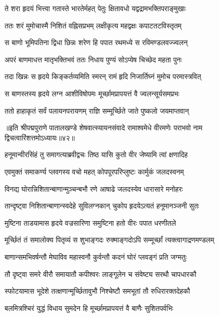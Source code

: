 \twolineshloka
{ते शरा हृदयं भित्त्वा गतास्ते भारतेर्महत्}
{पेतुः क्षितावधो यद्वद्रामभक्तिपराङ्मुखाः}%

\twolineshloka
{ततः शरं मुमोचास्मै निशितं वह्निसप्रभम्}
{लक्षीकृत्य महद्वक्षः कपाटतटविस्तृतम्}%

\twolineshloka
{स बाणो भूमिपतिना द्विधा छिन्नः शरेण हि}
{पपात रथमध्ये स रविमण्डलवज्ज्वलन्}%

\twolineshloka
{अपरं बाणमाधत्त मातृभक्तिभवं ततः}
{निधाय पुण्यं सोऽप्येष चिच्छेद महता पुनः}%

\twolineshloka
{तदा खिन्नः स हृदये किङ्कर्तव्यमिति स्मरन्}
{रामं हृदि निजार्तिघ्नं मुमोच परमास्त्रवित्}%

\twolineshloka
{स बाणस्तस्य हृदये लग्न आशीविषोपमः}
{मूर्च्छामप्रापयत्तं वै ज्वलन्सूर्यसमप्रभः}%

\twolineshloka
{ततो हाहाकृतं सर्वं पलायनपरायणम्}
{राज्ञि सम्मूर्च्छिते जाते पुष्कलो जयमाप्तवान्}%

॥इति श्रीपद्मपुराणे पातालखण्डे शेषवात्स्यायनसंवादे रामाश्वमेधे वीरमणेः पराभवो नाम द्विचत्वारिंशत्तमोऽध्यायः॥४२॥



\twolineshloka
{हनूमान्वीरसिंहं तु समागत्याब्रवीद्वचः}
{तिष्ठ यासि कुतो वीर जेष्यामि त्वां क्षणादिह}%

\twolineshloka
{एवमुक्तं समाकर्ण्य प्लवगस्य वचो महत्}
{कोपपूरपरिप्लुष्टः कार्मुकं जलदस्वनम्}%

\twolineshloka
{विनद्य घोरान्निशितान्बाणान्मुञ्चन्बभौ रणे}
{आषाढे जलदस्येव धारासारे मनोहरः}%

\twolineshloka
{तान्दृष्ट्वा निशितान्बाणान्स्वदेहे सुविलग्नकान्}
{चुकोप हृदयेऽत्यतं हनूमानञ्जनी सुतः}%

\twolineshloka
{मुष्टिना ताडयामास हृदये वज्रसारिणा}
{समुष्टिना हतो वीरः पपात धरणीतले}%

\twolineshloka
{मूर्च्छितं तं समालोक्य पितृव्यं स शुभाङ्गदः}
{रुक्माङ्गदोऽपि सम्मूर्च्छां त्यक्त्वागाद्रणमण्डलम्}%

\twolineshloka
{बाणान्समभिवर्षन्तौ मेघाविव महास्वनौ}
{कुर्वन्तौ कदनं घोरं प्लवङ्गं प्रति जग्मतुः}%

\twolineshloka
{तौ दृष्ट्वा समरे वीरौ समायातौ कपीश्वरः}
{लाङ्गूलेन च संवेष्ट्य सरथौ चापधारकौ}%

\twolineshloka
{स्फोटयामास भूदेशे तत्क्षणान्मूर्च्छितावुभौ}
{निश्चेष्टौ समभूतां तौ रुधिरारक्तदेहकौ}%

\twolineshloka
{बलमित्रश्चिरं युद्धं विधाय सुमदेन हि}
{मूर्च्छामप्रापयत्तं वै बाणैः सुशितपर्वभिः}%

